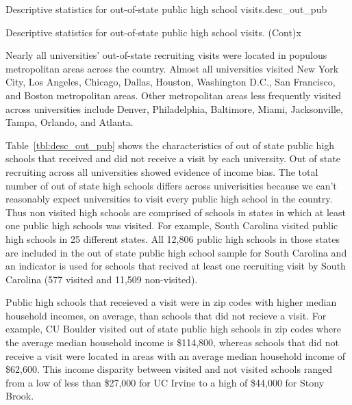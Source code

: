 \documentclass[twoside]{article}
\begin{document}
\begin{lscape-env}{Descriptive statistics for out-of-state public high school visits.}{desc_out_pub}
  
\end{lscape-env}

 \begin{lscape-env}{Descriptive statistics for out-of-state public high school visits. (Cont)}{x}
  
\end{lscape-env}

Nearly all universities' out-of-state recruiting visits were located in populous metropolitan areas across the country. Almost all universities visited New York City, Los Angeles, Chicago, Dallas, Houston, Washington D.C., San Francisco, and Boston metropolitan areas. Other metropolitan areas less frequently visited across universities include Denver, Philadelphia, Baltimore, Miami, Jacksonville, Tampa, Orlando, and Atlanta.

Table~\ref{tbl:desc_out_pub} shows the characteristics of out of state public high schools that received and did not receive a visit by each university. Out of state recruiting across all universities showed evidence of income bias. The total number of out of state high schools differs across univerisities because we can't reasonably expect universities to visit every public high school in the country. Thus non visited high schools are comprised of schools in states in which at least one public high schools was visited. For example, South Carolina visited public high schools in 25 different states. All 12,806 public high schools in those states are included in the out of state public high school sample for South Carolina and an indicator is used for schools that recived at least one recruiting visit by South Carolina (577 visited and 11,509 non-visited).

Public high schools that receieved a visit were in zip codes with higher median household incomes, on average, than schools that did not recieve a visit. For example, CU Boulder visited out of state public high schools in zip codes where the average median household income is \$114,800, whereas schools that did not receive a visit were located in areas with an average median household income of \$62,600. This income disparity between visited and not visited schools ranged from a low of less than \$27,000 for UC Irvine to a high of \$44,000 for Stony Brook.
\end{document}
